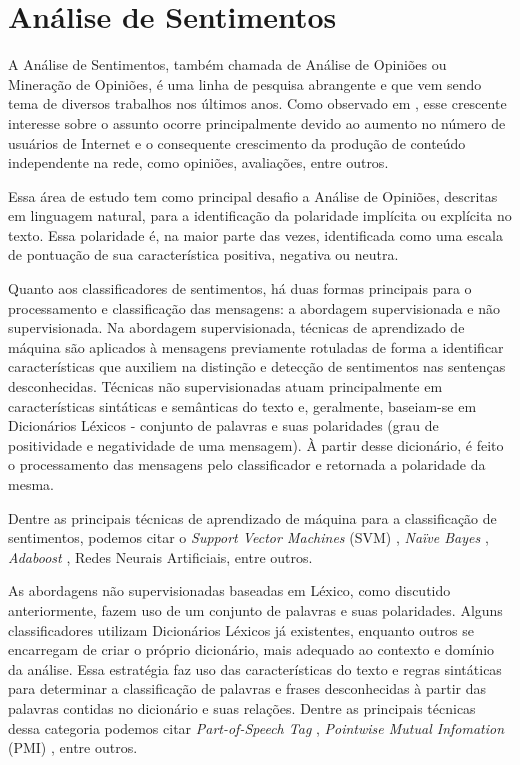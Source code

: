\documentclass[12pt]{article}
\begin{document}
\section{Análise de Sentimentos}
A Análise de Sentimentos, também chamada de Análise de Opiniões ou Mineração de Opiniões, é uma linha de pesquisa abrangente e que vem sendo tema de diversos trabalhos nos últimos anos. Como observado em \cite{liu2010multifaceted}, esse crescente interesse sobre o assunto ocorre principalmente devido ao aumento no número de usuários de Internet e o consequente crescimento da produção de conteúdo independente na rede, como opiniões, avaliações, entre outros. 

Essa área de estudo tem como principal desafio a Análise de Opiniões, descritas em linguagem natural, para a identificação da polaridade implícita ou explícita no texto. Essa polaridade é, na maior parte das vezes, identificada como uma escala de pontuação de sua característica positiva, negativa ou neutra.

Quanto aos classificadores de sentimentos, há duas formas principais para o processamento e classificação das mensagens: a abordagem supervisionada e não supervisionada. Na abordagem supervisionada, técnicas de aprendizado de máquina são aplicados à mensagens previamente rotuladas de forma a identificar características que auxiliem na distinção e detecção de sentimentos nas sentenças desconhecidas. Técnicas não supervisionadas atuam principalmente em características sintáticas e semânticas do texto e, geralmente, baseiam-se em Dicionários Léxicos - conjunto de palavras e suas polaridades (grau de positividade e negatividade de uma mensagem). À partir desse dicionário, é feito o processamento das mensagens pelo classificador e retornada a polaridade da mesma. \cite{araujo2013metodos}

Dentre as principais técnicas de aprendizado de máquina para a classificação de sentimentos, podemos citar o \emph{Support Vector Machines} (SVM) \cite{HADDI2013}, \emph{Naïve Bayes} \cite{Iqbal}, \emph{Adaboost} \cite{graff2017semantic}, Redes Neurais Artificiais, entre outros. \cite{Rodrigues2016}

As abordagens não supervisionadas baseadas em Léxico, como discutido anteriormente, fazem uso de um conjunto de palavras e suas polaridades. Alguns classificadores utilizam Dicionários Léxicos já existentes, enquanto outros se encarregam de criar o próprio dicionário, mais adequado ao contexto e domínio da análise. Essa estratégia faz uso das características do texto e regras sintáticas para determinar a classificação de palavras e frases desconhecidas à partir das palavras contidas no dicionário e suas relações. Dentre as principais técnicas dessa categoria podemos citar \emph{Part-of-Speech Tag} \cite{becker2013}, \emph{Pointwise Mutual Infomation} (PMI) \cite{Turney2002}, entre outros.
\end{document}
